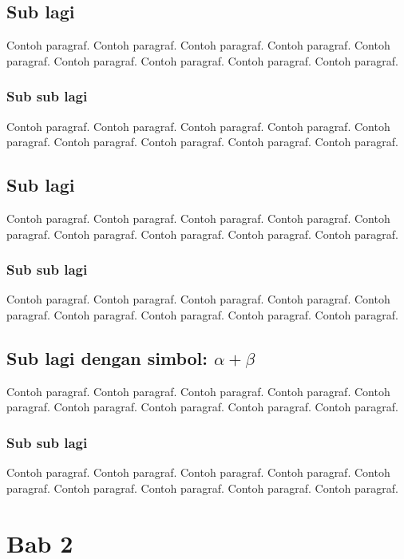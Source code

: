 \documentclass[a4paper,twoside,bahasa,nobib]{tufte-book}
\begin{document}
\section{Sub lagi}

Contoh paragraf. Contoh paragraf. Contoh paragraf. Contoh paragraf.
Contoh paragraf. Contoh paragraf. Contoh paragraf. Contoh paragraf.
Contoh paragraf.

\subsection{Sub sub lagi}

Contoh paragraf. Contoh paragraf. Contoh paragraf. Contoh paragraf.
Contoh paragraf. Contoh paragraf. Contoh paragraf. Contoh paragraf.
Contoh paragraf.

\section{Sub lagi}

Contoh paragraf. Contoh paragraf. Contoh paragraf. Contoh paragraf.
Contoh paragraf. Contoh paragraf. Contoh paragraf. Contoh paragraf.
Contoh paragraf.

\subsection{Sub sub lagi}

Contoh paragraf. Contoh paragraf. Contoh paragraf. Contoh paragraf.
Contoh paragraf. Contoh paragraf. Contoh paragraf. Contoh paragraf.
Contoh paragraf.

\section{Sub lagi dengan simbol: $\alpha + \beta$}

Contoh paragraf. Contoh paragraf. Contoh paragraf. Contoh paragraf.
Contoh paragraf. Contoh paragraf. Contoh paragraf. Contoh paragraf.
Contoh paragraf.

\subsection{Sub sub lagi}

Contoh paragraf. Contoh paragraf. Contoh paragraf. Contoh paragraf.
Contoh paragraf. Contoh paragraf. Contoh paragraf. Contoh paragraf.
Contoh paragraf.



\chapter{Bab 2}
\end{document}
